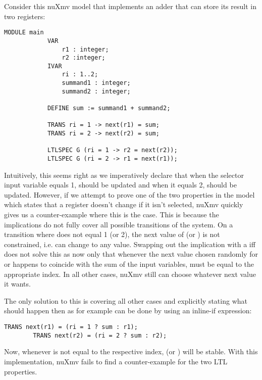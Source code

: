 \begin{example}
    Consider this nuXmv model that implements an adder that can store its result in two registers:
    \begin{lstlisting}[language=smv]
        MODULE main
            VAR
                r1 : integer;
                r2 :integer;
            IVAR
                ri : 1..2;
                summand1 : integer;
                summand2 : integer;

            DEFINE sum := summand1 + summand2;

            TRANS ri = 1 -> next(r1) = sum;
            TRANS ri = 2 -> next(r2) = sum;

            LTLSPEC G (ri = 1 -> r2 = next(r2));
            LTLSPEC G (ri = 2 -> r1 = next(r1));
    \end{lstlisting}

    Intuitively, this seems right as we imperatively declare that when the selector input variable  equals 1,  should be updated and when it equals 2,  should be updated.
    However, if we attempt to prove one of the two properties in the model which states that a register doesn't change if it isn't selected, nuXmv quickly gives us a counter-example where this is the case.
    This is because the implications do not fully cover all possible transitions of the system.
    On a transition where  does not equal 1 (or 2), the next value of  (or ) is not constrained, i.e. can change to any value.
    Swapping out the implication \smv{->} with a iff \smv{<->} does not solve this as now only that whenever the next value chosen randomly for  or  happens to coincide with the sum of the input variables,  must be equal to the appropriate index.
    In all other cases, nuXmv still can choose whatever next value it wants.

    The only solution to this is covering all other cases and explicitly stating what should happen then as for example can be done by using an inline-if expression:
    \begin{lstlisting}[language=smv]
        TRANS next(r1) = (ri = 1 ? sum : r1);
        TRANS next(r2) = (ri = 2 ? sum : r2);
    \end{lstlisting}

    Now, whenever  is not equal to the respective index,  (or ) will be stable.
    With this implementation, nuXmv fails to find a counter-example for the two LTL properties.
\end{example}

